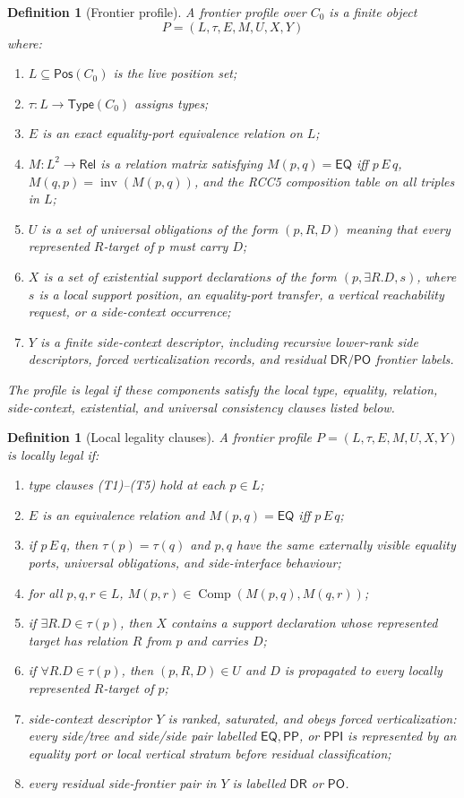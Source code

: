 \documentclass[11pt]{article}
\newtheorem{definition}[theorem]{Definition}
\newcommand{\Rel}{\mathsf{Rel}}
\newcommand{\EQ}{\mathsf{EQ}}
\newcommand{\PP}{\mathsf{PP}}
\newcommand{\PPI}{\mathsf{PPI}}
\newcommand{\PO}{\mathsf{PO}}
\newcommand{\DR}{\mathsf{DR}}
\newcommand{\Comp}{\operatorname{Comp}}
\newcommand{\Inv}{\operatorname{inv}}
\newcommand{\Typ}{\mathsf{Type}}
\newcommand{\Pos}{\mathsf{Pos}}
\begin{document}
\begin{definition}[Frontier profile]
A frontier profile over $C_0$ is a finite object
\[
  P=(L,\tau,E,M,U,X,Y)
\]
where:
\begin{enumerate}[label=(P\arabic*)]
\item $L\subseteq\Pos(C_0)$ is the live position set;
\item $\tau:L\to\Typ(C_0)$ assigns types;
\item $E$ is an exact equality-port equivalence relation on $L$;
\item $M:L^2\to\Rel$ is a relation matrix satisfying $M(p,q)=\EQ$ iff $p\,E\,q$, $M(q,p)=\Inv(M(p,q))$, and the RCC5 composition table on all triples in $L$;
\item $U$ is a set of universal obligations of the form $(p,R,D)$ meaning that every represented $R$-target of $p$ must carry $D$;
\item $X$ is a set of existential support declarations of the form $(p,\exists R.D,s)$, where $s$ is a local support position, an equality-port transfer, a vertical reachability request, or a side-context occurrence;
\item $Y$ is a finite side-context descriptor, including recursive lower-rank side descriptors, forced verticalization records, and residual $\DR/\PO$ frontier labels.
\end{enumerate}
The profile is legal if these components satisfy the local type, equality, relation, side-context, existential, and universal consistency clauses listed below.
\end{definition}

\begin{definition}[Local legality clauses]
A frontier profile $P=(L,\tau,E,M,U,X,Y)$ is locally legal if:
\begin{enumerate}[label=(L\arabic*)]
\item type clauses (T1)--(T5) hold at each $p\in L$;
\item $E$ is an equivalence relation and $M(p,q)=\EQ$ iff $p\,E\,q$;
\item if $p\,E\,q$, then $\tau(p)=\tau(q)$ and $p,q$ have the same externally visible equality ports, universal obligations, and side-interface behaviour;
\item for all $p,q,r\in L$, $M(p,r)\in\Comp(M(p,q),M(q,r))$;
\item if $\exists R.D\in\tau(p)$, then $X$ contains a support declaration whose represented target has relation $R$ from $p$ and carries $D$;
\item if $\forall R.D\in\tau(p)$, then $(p,R,D)\in U$ and $D$ is propagated to every locally represented $R$-target of $p$;
\item side-context descriptor $Y$ is ranked, saturated, and obeys forced verticalization: every side/tree and side/side pair labelled $\EQ,\PP$, or $\PPI$ is represented by an equality port or local vertical stratum before residual classification;
\item every residual side-frontier pair in $Y$ is labelled $\DR$ or $\PO$.
\end{enumerate}
\end{definition}
\end{document}
